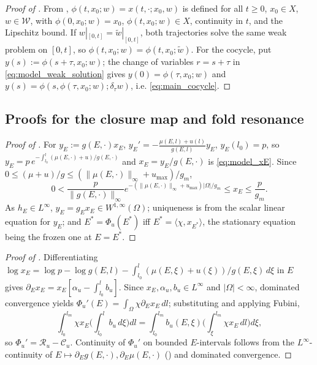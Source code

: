 \documentclass[a4paper,fleqn,longmktitle]{cas-sc}
\theoremstyle{plain}
\theoremstyle{definition}
\theoremstyle{remark}
\numberwithin{equation}{section}
\begin{document}
\begin{proof}[Proof of ]
From , \(\phi(t,x_0;w)=x(t,\cdot;x_0,w)\) is
defined for all \(t\ge0\), \(x_0\in X\), \(w\in\mathcal W\), with
\(\phi(0,x_0;w)=x_0\), \(\phi(t,x_0;w)\in X\), continuity in \(t\), and the
Lipschitz bound. If \(w|_{[0,t]}=\widetilde w|_{[0,t]}\), both trajectories
solve the same weak problem on \([0,t]\), so
\(\phi(t,x_0;w)=\phi(t,x_0;\widetilde w)\). For the cocycle, put
\(y(s):=\phi(s+\tau,x_0;w)\); the change of variables \(r=s+\tau\) in
\eqref{eq:model_weak_solution} gives \(y(0)=\phi(\tau,x_0;w)\) and
\(y(s)=\phi(s,\phi(\tau,x_0;w);\delta_\tau w)\), i.e. \eqref{eq:main_cocycle}.
\end{proof}
\subsection{Proofs for the closure map and fold resonance}
\label{subsec:proof_closure}
\begin{proof}[Proof of ]
For \(y_E:=g(E,\cdot)x_E\), \(y_E'=-\tfrac{\mu(E,l)+u(l)}{g(E,l)}y_E\),
\(y_E(l_0)=p\), so \(y_E=p\,e^{-\int_{l_0}^l(\mu(E,\cdot)+u)/g(E,\cdot)}\) and
\(x_E=y_E/g(E,\cdot)\) is \eqref{eq:model_xE}. Since
\(0\le(\mu+u)/g\le(\|\mu(E,\cdot)\|_\infty+u_{\max})/g_m\),
\[
    0<
    \frac{p}{\|g(E,\cdot)\|_\infty}
    e^{-(\|\mu(E,\cdot)\|_\infty+u_{\max})|\Omega|/g_m}
    \le
    x_E
    \le
    \frac{p}{g_m}.
\]
As \(h_E\in L^\infty\), \(y_E=g_Ex_E\in W^{1,\infty}(\Omega)\); uniqueness is
from the scalar linear equation for \(y_E\); and \(E^*=\Phi_u(E^*)\) iff
\(E^*=\langle\chi,x_{E^*}\rangle\), the stationary equation being the frozen one
at \(E=E^*\).
\end{proof}
\begin{proof}[Proof of ]
Differentiating
\(\log x_E=\log p-\log g(E,l)-\int_{l_0}^l(\mu(E,\xi)+u(\xi))/g(E,\xi)\,d\xi\) in
\(E\) gives \(\partial_E x_E=x_E[\alpha_u-\int_{l_0}^l b_u]\). Since
\(x_E,\alpha_u,b_u\in L^\infty\) and \(|\Omega|<\infty\), dominated convergence
yields \(\Phi_u'(E)=\int_\Omega\chi\partial_E x_E\,dl\); substituting and
applying Fubini,
\[
    \int_{l_0}^{l_m}\chi x_E\Big(\int_{l_0}^l b_u\,d\xi\Big)dl
    =
    \int_{l_0}^{l_m}b_u(E,\xi)\Big(\int_\xi^{l_m}\chi x_E\,dl\Big)d\xi,
\]
so \(\Phi_u'=\mathcal R_u-\mathcal C_u\). Continuity of \(\Phi_u'\) on bounded
\(E\)-intervals follows from the \(L^\infty\)-continuity of
\(E\mapsto\partial_Eg(E,\cdot),\partial_E\mu(E,\cdot)\)
() and dominated convergence.
\end{proof}
\end{document}
